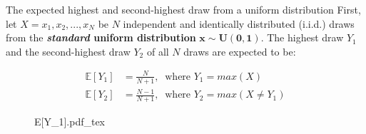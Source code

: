 \begin{frame}{The expected highest and second-highest draw from a uniform distribution}
    First, let $X=x_1,x_2,...,x_N$ be $N$ independent and identically distributed (i.i.d.) draws from the \textbf{\textit{standard} uniform distribution} $\bm{x\sim U(0, 1)}$. The highest draw $Y_1$ and the second-highest draw $Y_2$ of all $N$ draws are expected to be: \vspace{-8pt}
    \begin{multicols}{2}
      \begin{align*}
        \mathbb{E}[Y_1]&=\frac{N}{N+1},\ \text{ where }Y_1=max(X)\\
        \mathbb{E}[Y_2]&=\frac{N-1}{N+1},\ \text{ where }Y_2=max(X\neq Y_1)
      \end{align*}
      \vfill\null\columnbreak
      \begin{figure}[!h]
        \center
        \def\svgwidth{1.1\columnwidth}
        {E[Y_1].pdf_tex}
      \end{figure}
      \vfill\null
    \end{multicols}
\end{frame}
